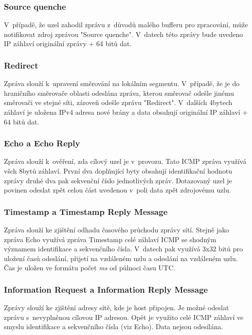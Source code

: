 \documentclass[12pt, a4paper]{article}
\begin{document}
\subsubsection{Source quenche}

V~případě, že uzel zahodil zprávu z~důvodů malého bufferu pro zpracování, může notifikovat zdroj zprávou "Source quenche". V~datech této zprávy bude uvedeno IP záhlaví originální zprávy + 64 bitů dat.

\subsubsection{Redirect}

Zpráva slouží k~upravení směrování na lokálním segmentu. V~případě, že je do hraničního směrovače oblasti odeslána zpráva, kterou směrovač odešle jinému směrovači ve stejné síti, zároveň odešle zprávu "Redirect". V~dalších 4bytech záhlaví je uložena IPv4 adresa nové brány a data obsahují originální IP záhlaví + 64 bitů dat. 

\subsubsection{Echo a Echo Reply}

Zpráva slouží k~ověření, zda cílový uzel je v~provozu. Tato ICMP zpráva využívá všch 8bytů záhlaví. První dva doplňující byty obsahují identifikační hodnotu zprávy druhé dva pak sekvenční číslo jednotlivých zpráv. Dotazovaný uzel je povinen odeslat zpět celou část uvedenou v~poli data zpět zdrojovému uzlu.

\subsubsection{Timestamp a Timestamp Reply Message}

Zpráva slouží ke zjištění odhadu časového průchodu zprávy sítí. Stejně jako zpráva Echo využívá zpráva Timestamp celé záhlaví ICMP se shodným významem identifikace a sekvenčního čísla. V~datech pak využívá 3x32 bitů pro uložení časů odeslání, přijetí na vzdáleném uzlu a odeslání na vzdáleném uzlu. Čas je uložen ve formátu počet \emph{ms} od půlnoci času UTC.

\subsubsection{Information Request a Information Reply Message}

Zprávy slouží ke zjištění adresy sítě, kde je host připojen. Je možné odeslat zprávu s~nevyplněnou cílovou IP adresou. Opět je využito celé ICMP záhlaví ve smyslu identifikace a sekvenčního čísla (viz Echo). Data nejsou odesílána.
\end{document}
